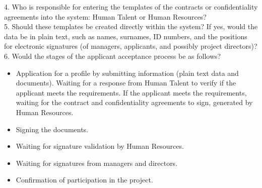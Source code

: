 \documentclass{scrreprt}
\begin{document}
4. Who is responsible for entering the templates of the contracts or confidentiality agreements into the system: Human Talent or Human Resources?\\

5. Should these templates be created directly within the system? If yes, would the data be in plain text, such as names, surnames, ID numbers, and the positions for electronic signatures (of managers, applicants, and possibly project directors)?\\

6. Would the stages of the applicant acceptance process be as follows?
\begin{itemize}
    \item Application for a profile by submitting information (plain text data and documents).
    Waiting for a response from Human Talent to verify if the applicant meets the requirements.
    If the applicant meets the requirements, waiting for the contract and confidentiality agreements to sign, generated by Human Resources.
    \item Signing the documents.
    \item  Waiting for signature validation by Human Resources.
    \item  Waiting for signatures from managers and directors.
    \item Confirmation of participation in the project.
\end{itemize}
\end{document}
